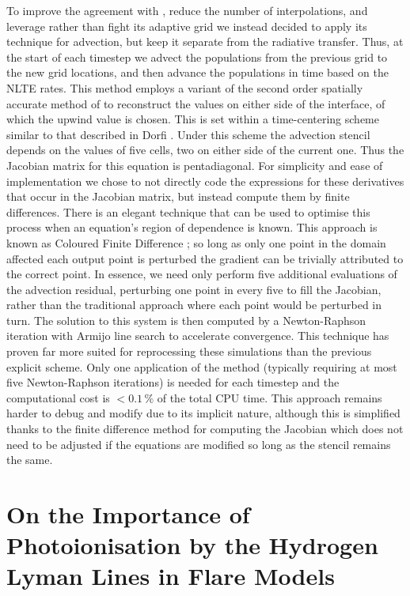 To improve the agreement with \Radyn{}, reduce the number of interpolations, and leverage rather than fight its adaptive grid we instead decided to apply its technique for advection, but keep it separate from the radiative transfer.
Thus, at the start of each timestep we advect the populations from the previous grid to the new grid locations, and then advance the populations in time based on the NLTE rates.
This method employs a variant of the second order spatially accurate method of \citet{VanLeer1979} to reconstruct the values on either side of the interface, of which the upwind value is chosen.
This is set within a time-centering scheme similar to that described in Dorfi \NeedRef{}.
Under this scheme the advection stencil depends on the values of five cells, two on either side of the current one.
Thus the Jacobian matrix for this equation is pentadiagonal.
For simplicity and ease of implementation we chose to not directly code the expressions for these derivatives that occur in the Jacobian matrix, but instead compute them by finite differences.
There is an elegant technique that can be used to optimise this process when an equation's region of dependence is known.
This approach is known as Coloured Finite Difference \citep{Curtis1974}; so long as only one point in the domain affected each output point is perturbed the gradient can be trivially attributed to the correct point.
In essence, we need only perform five additional evaluations of the advection residual, perturbing one point in every five to fill the Jacobian, rather than the traditional approach where each point would be perturbed in turn.
The solution to this system is then computed by a Newton-Raphson iteration with Armijo line search \NeedRef{} to accelerate convergence.
This technique has proven far more suited for reprocessing these simulations than the previous explicit scheme.
Only one application of the method (typically requiring at most five Newton-Raphson iterations) is needed for each timestep and the computational cost is $<0.1\,\%$ of the total CPU time.
This approach remains harder to debug and modify due to its implicit nature, although this is simplified thanks to the finite difference method for computing the Jacobian which does not need to be adjusted if the equations are modified so long as the stencil remains the same.

\section{On the Importance of \Caii{} Photoionisation by the Hydrogen Lyman Lines in Flare Models}

